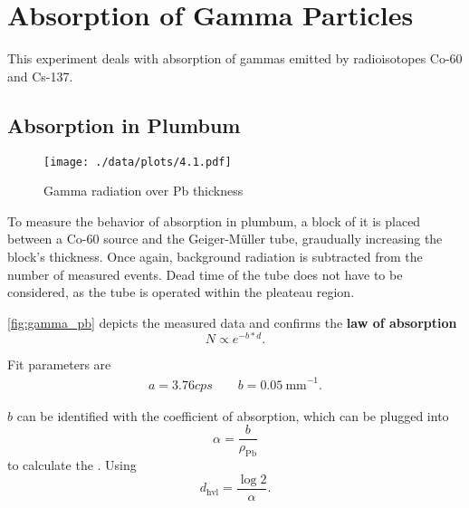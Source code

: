 \chapter{Absorption of Gamma Particles}
This experiment deals with absorption of gammas emitted by radioisotopes Co-60 and Cs-137.

\section{Absorption in Plumbum}
\begin{figure}[ht!]
	\centering
	\texttt{[image: ./data/plots/4.1.pdf]}
	\caption[Gamma radiation over Pb thickness]{Gamma radiation over Pb thickness}
	\label{fig:gamma_pb}
\end{figure}
To measure the behavior of absorption in plumbum, a block of it is placed between a Co-60 source and the Geiger-Müller tube, graudually increasing the block's thickness.
Once again, background radiation is subtracted from the number of measured events.
Dead time of the tube does not have to be considered, as the tube is operated within the pleateau region.

\autoref{fig:gamma_pb} depicts the measured data and confirms the \textbf{law of absorption}
\begin{equation*}
	N\propto e^{-b*d}.
\end{equation*}

Fit parameters are
\begin{gather*}
	a=\num{3.76}cps\qquad b=\SI{0.05}{\milli\meter}^{-1}.
\end{gather*}

$b$ can be identified with the coefficient of absorption, which can be plugged into
\begin{equation*}
	\alpha=\frac{b}{\rho_\text{Pb}}
\end{equation*}
to calculate the .
Using
\begin{equation*}
	d_\text{hvl}=\frac{\log{2}}{\alpha}.
\end{equation*}
